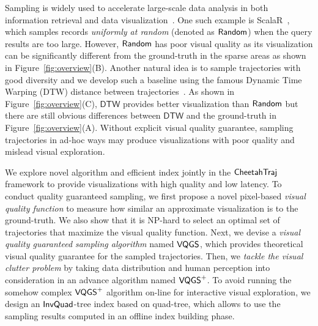  Sampling is widely used to accelerate large-scale data analysis in both information retrieval and data visualization~\cite{qin2020making,DBLP:conf/sigmod/DingHCC016,DBLP:journals/pvldb/KimBPIMR15,park2016visualization}. 
One such example is ScalaR~\cite{battle2013dynamic}, which samples records \textit{uniformly at random} (denoted as $\mathsf{Random}$) when the query results are too large. However, $\mathsf{Random}$ has poor visual quality as its visualization can be significantly different from the ground-truth in the sparse areas as shown in Figure~\ref{fig:overview}(B). 
Another natural idea is to sample trajectories with good diversity and we develop such a baseline using the famous Dynamic Time Warping (DTW) distance between trajectories~\cite{borcan2012improving}. As shown in Figure~\ref{fig:overview}(C), $\mathsf{DTW}$ provides better visualization than $\mathsf{Random}$ but there are still obvious differences between $\mathsf{DTW}$ and the ground-truth in Figure~\ref{fig:overview}(A). 
Without explicit visual quality guarantee, sampling trajectories in ad-hoc ways may produce visualizations with poor quality and mislead visual exploration.


 We explore novel algorithm and efficient index jointly in the $\mathsf{CheetahTraj}$ framework to provide visualizations with high quality and low latency. To conduct quality guaranteed sampling, we first propose a novel pixel-based \textit{visual quality function} to measure how similar an approximate visualization is to the ground-truth. We also show that it is NP-hard to select an optimal set of trajectories that maximize the visual quality function. Next, we devise a \textit{visual quality guaranteed sampling algorithm} named $\mathsf{VQGS}$, which provides theoretical visual quality guarantee for the sampled trajectories. Then, we \textit{tackle the visual clutter problem} by taking data distribution and human perception into consideration in an advance algorithm named $\mathsf{VQGS}^+$. To avoid running the somehow complex $\mathsf{VQGS}^+$ algorithm on-line for interactive visual exploration, we design an $\mathsf{InvQuad}$-tree index based on quad-tree, which allows to use the sampling results computed in an offline index building phase. 

